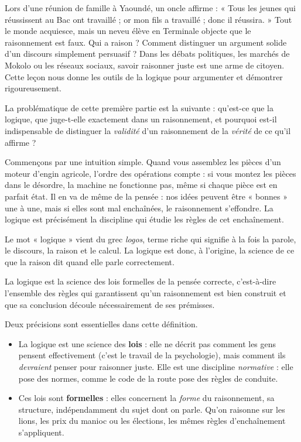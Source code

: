 \documentclass[11pt]{article}
\newcommand{\cle}[1]{{\popxbold\color{popdark}#1}}
\newcounter{popsec}
\newcounter{popsub}
\newcommand{\courssub}[1]{%
  \stepcounter{popsub}%
  \par\vspace{9pt}\noindent{\popxbold\fontsize{11.5}{13}\selectfont\color{popink}{\color{poporange}\thepopsec.\thepopsub}\hspace{6pt}#1}\par\nopagebreak\vspace{4pt}
}
\begin{document}
Lors d'une réunion de famille à Yaoundé, un oncle affirme : « Tous les jeunes qui réussissent au Bac ont travaillé ; or mon fils a travaillé ; donc il réussira. » Tout le monde acquiesce, mais un neveu élève en Terminale objecte que le raisonnement est faux. Qui a raison ? Comment distinguer un argument solide d'un discours simplement persuasif ? Dans les débats politiques, les marchés de Mokolo ou les réseaux sociaux, savoir raisonner juste est une arme de citoyen. Cette leçon nous donne les outils de la logique pour argumenter et démontrer rigoureusement.

La problématique de cette première partie est la suivante : qu'est-ce que la logique, que juge-t-elle exactement dans un raisonnement, et pourquoi est-il indispensable de distinguer la \emph{validité} d'un raisonnement de la \emph{vérité} de ce qu'il affirme ?

\courssub{Définition et étymologie de la logique}

Commençons par une intuition simple. Quand vous assemblez les pièces d'un moteur d'engin agricole, l'ordre des opérations compte : si vous montez les pièces dans le désordre, la machine ne fonctionne pas, même si chaque pièce est en parfait état. Il en va de même de la pensée : nos idées peuvent être « bonnes » une à une, mais si elles sont mal enchaînées, le raisonnement s'effondre. La logique est précisément la discipline qui étudie les règles de cet enchaînement.

Le mot « logique » vient du grec \emph{logos}, terme riche qui signifie à la fois la \cle{parole}, le \cle{discours}, la \cle{raison} et le \cle{calcul}. La logique est donc, à l'origine, la science de ce que la raison dit quand elle parle correctement.

\begin{definition}[La logique]
La \cle{logique} est la science des lois formelles de la pensée correcte, c'est-à-dire l'ensemble des règles qui garantissent qu'un raisonnement est bien construit et que sa conclusion découle nécessairement de ses prémisses.
\end{definition}

Deux précisions sont essentielles dans cette définition.

\begin{itemize}
\item La logique est une science des \textbf{lois} : elle ne décrit pas comment les gens pensent effectivement (c'est le travail de la psychologie), mais comment ils \emph{devraient} penser pour raisonner juste. Elle est une discipline \emph{normative} : elle pose des normes, comme le code de la route pose des règles de conduite.
\item Ces lois sont \textbf{formelles} : elles concernent la \emph{forme} du raisonnement, sa structure, indépendamment du sujet dont on parle. Qu'on raisonne sur les lions, les prix du manioc ou les élections, les mêmes règles d'enchaînement s'appliquent.
\end{itemize}
\end{document}
